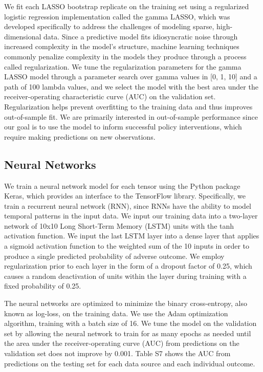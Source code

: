 \documentclass[10pt, letter]{article}
\begin{document}
We fit each LASSO bootstrap replicate on the training set using a regularized logistic regression implementation called the gamma LASSO, which was developed specifically to address the challenges of modeling sparse, high-dimensional data. Since a predictive model fits idiosyncratic noise through increased complexity in the model's structure, machine learning techniques commonly penalize complexity in the models they produce through a process called regularization. We tune the regularization parameters for the gamma LASSO model through a parameter search over gamma values in [0, 1, 10] and a path of 100 lambda values, and we select the model with the best area under the receiver-operating characteristic curve (AUC) on the validation set. Regularization helps prevent overfitting to the training data and thus improves out-of-sample fit. We are primarily interested in out-of-sample performance since our goal is to use the model to inform successful policy interventions, which require making predictions on new observations.

\subsection{Neural Networks}

We train a neural network model for each tensor using the Python package Keras, which provides an interface to the TensorFlow library. Specifically, we train a recurrent neural network (RNN), since RNNs have the ability to model temporal patterns in the input data. We input our training data into a two-layer network of 10x10 Long Short-Term Memory (LSTM) units with the tanh activation function. We input the last LSTM layer into a dense layer that applies a sigmoid activation function to the weighted sum of the 10 inputs in order to produce a single predicted probability of adverse outcome. We employ regularization prior to each layer in the form of a dropout factor of 0.25, which causes a random deactivation of units within the layer during training with a fixed probability of 0.25.

The neural networks are optimized to minimize the binary cross-entropy, also known as log-loss, on the training data. We use the Adam optimization algorithm, training with a batch size of 16. We tune the model on the validation set by allowing the neural network to train for as many epochs as needed until the area under the receiver-operating curve (AUC) from predictions on the validation set does not improve by 0.001. Table S7 shows the AUC from predictions on the testing set for each data source and each individual outcome.
\end{document}
